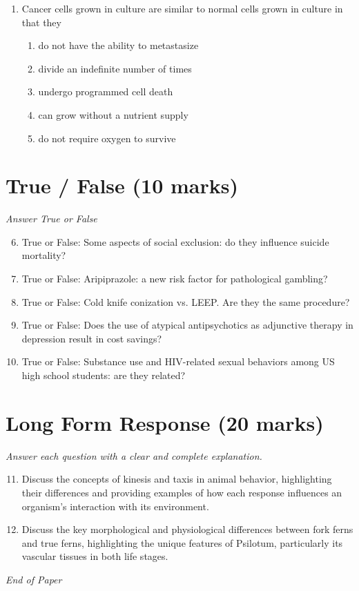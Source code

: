 \documentclass[12pt]{article}
\begin{document}
\begin{enumerate}[label=\arabic*.]
\begin{enumerate}[label=(\alph*)]
    \item 3/4
    \item 2/3
    \item 1/16
    \item 1/4
    \item 1/5
\end{enumerate}
\item Cancer cells grown in culture are similar to normal cells grown in culture in that they
\begin{enumerate}[label=(\alph*)]
    \item do not have the ability to metastasize
    \item divide an indefinite number of times
    \item undergo programmed cell death
    \item can grow without a nutrient supply
    \item do not require oxygen to survive
\end{enumerate}
\end{enumerate}

\section*{True / False (10 marks)}
\textit{Answer True or False}
\begin{enumerate}[label=\arabic*.]
\setcounter{enumi}{5}
\item True or False: Some aspects of social exclusion: do they influence suicide mortality?
\item True or False: Aripiprazole: a new risk factor for pathological gambling?
\item True or False: Cold knife conization vs. LEEP. Are they the same procedure?
\item True or False: Does the use of atypical antipsychotics as adjunctive therapy in depression result in cost savings?
\item True or False: Substance use and HIV-related sexual behaviors among US high school students: are they related?
\end{enumerate}

\section*{Long Form Response (20 marks)}
\textit{Answer each question with a clear and complete explanation.}
\begin{enumerate}[label=\arabic*.]
\setcounter{enumi}{10}
\item Discuss the concepts of kinesis and taxis in animal behavior, highlighting their differences and providing examples of how each response influences an organism's interaction with its environment.
\item Discuss the key morphological and physiological differences between fork ferns and true ferns, highlighting the unique features of Psilotum, particularly its vascular tissues in both life stages.
\end{enumerate}

\vfill
\noindent\textit{End of Paper}
\end{document}
